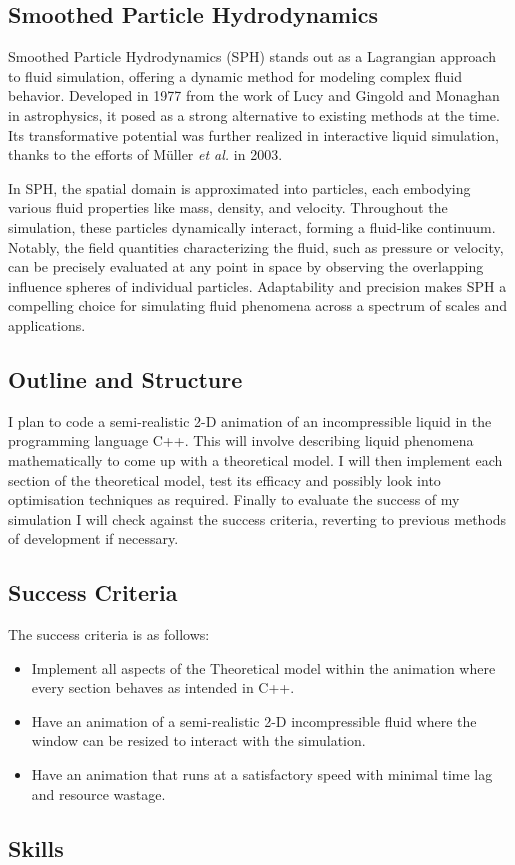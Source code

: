 \documentclass[write-up.tex]{subfiles}
\begin{document}
\subsection{Smoothed Particle Hydrodynamics}
Smoothed Particle Hydrodynamics (SPH) stands out as a Lagrangian approach to fluid simulation, offering a dynamic method for modeling complex fluid behavior. Developed in 1977 from the work of Lucy \cite{lucy} and Gingold and Monaghan \cite{gingold} in astrophysics, it posed as a strong alternative to existing methods at the time. Its transformative potential was further realized in interactive liquid simulation, thanks to the efforts of Müller \textit{et al.} \cite{muller} in 2003.

In SPH, the spatial domain is approximated into particles, each embodying various fluid properties like mass, density, and velocity. Throughout the simulation, these particles dynamically interact, forming a fluid-like continuum. Notably, the field quantities characterizing the fluid, such as pressure or velocity, can be precisely evaluated at any point in space by observing the overlapping influence spheres of individual particles. Adaptability and precision makes SPH a compelling choice for simulating fluid phenomena across a spectrum of scales and applications.

\subsection{Outline and Structure}
I plan to code a semi-realistic 2-D animation of an incompressible liquid in the programming language C++. This will involve describing liquid phenomena mathematically to come up with a theoretical model. I will then implement each section of the theoretical model, test its efficacy and possibly look into optimisation techniques as required. Finally to evaluate the success of my simulation I will check against the success criteria, reverting to previous methods of development if necessary.

\subsection{Success Criteria}
The success criteria is as follows:
\begin{itemize}
 \item Implement all aspects of the Theoretical model within the animation where every section behaves as intended in C++.
 \item Have an animation of a semi-realistic 2-D incompressible fluid where the window can be resized to interact with the simulation.
 \item Have an animation that runs at a satisfactory speed with minimal time lag and resource wastage.
\end{itemize}
\subsection{Skills}

\end{document}
